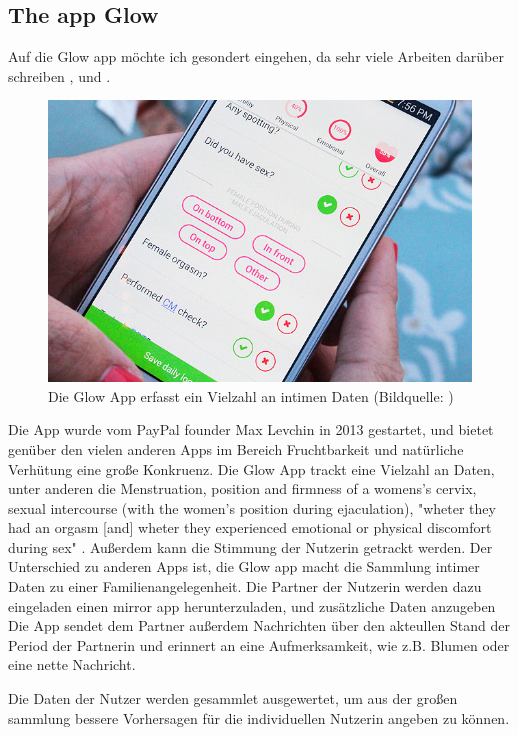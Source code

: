 \subsection{The app Glow}
Auf die Glow app möchte ich gesondert eingehen, da sehr viele Arbeiten darüber schreiben \cite{doi:10.1080/15265161.2017.1409823}, \cite{levy2014intimate} und \cite{doi:10.1080/13691058.2014.920528}.
\begin{figure}[htb]
	\centering
	\includegraphics[width=\linewidth]{img/Glow-App-review-screenshot-1.jpg}
	\caption{Die Glow App erfasst ein Vielzahl an intimen Daten (Bildquelle: \cite{glowApp})}
	\label{fig:glow_app}
\end{figure}
Die App wurde vom PayPal founder Max Levchin in 2013 gestartet, und bietet genüber den vielen anderen Apps im Bereich Fruchtbarkeit und natürliche Verhütung eine große Konkruenz. Die Glow App trackt eine Vielzahl an Daten, unter anderen die Menstruation, position and firmness of a womens's cervix, sexual intercourse (with the women's position during ejaculation), "wheter they had an orgasm [and] wheter they experienced emotional or physical discomfort during sex" \cite{doi:10.1080/13691058.2014.920528} . Außerdem kann die Stimmung der Nutzerin getrackt werden.
Der Unterschied zu anderen Apps ist, die Glow app macht die Sammlung intimer Daten zu einer Familienangelegenheit. Die Partner der Nutzerin werden dazu eingeladen einen mirror app herunterzuladen, und zusätzliche Daten anzugeben \cite{levy2014intimate} Die App sendet dem Partner außerdem Nachrichten über den akteullen Stand der Period der Partnerin und erinnert an eine Aufmerksamkeit, wie z.B. Blumen oder eine nette Nachricht.

Die Daten der Nutzer werden gesammlet ausgewertet, um aus der großen sammlung bessere Vorhersagen für die individuellen Nutzerin angeben zu können.

